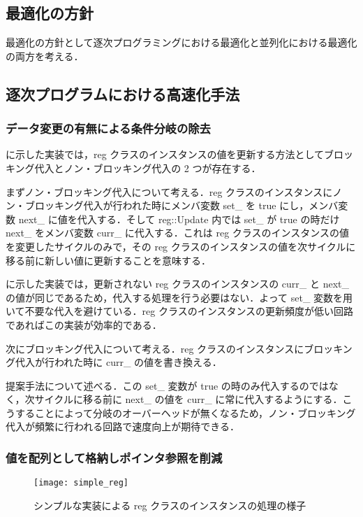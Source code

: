 \subsection{最適化の方針}

最適化の方針として逐次プログラミングにおける最適化と並列化における最適化の両方を考える．

\subsection{逐次プログラムにおける高速化手法}

\subsubsection{データ変更の有無による条件分岐の除去 \label{sss:no_set}}

 に示した実装では，reg
クラスのインスタンスの値を更新する方法としてブロッキング代入とノン・ブロッキング代入の
2 つが存在する．

まずノン・ブロッキング代入について考える．reg
クラスのインスタンスにノン・ブロッキング代入が行われた時にメンバ変数 set\_
を true にし，メンバ変数 next\_ に値を代入する．そして reg::Update
内では set\_ が true の時だけ next\_ をメンバ変数 curr\_
に代入する．これは reg
クラスのインスタンスの値を変更したサイクルのみで，その reg
クラスのインスタンスの値を次サイクルに移る前に新しい値に更新することを意味する．

 に示した実装では，更新されない reg
クラスのインスタンスの curr\_ と next\_
の値が同じであるため，代入する処理を行う必要はない．よって set\_
変数を用いて不要な代入を避けている．reg
クラスのインスタンスの更新頻度が低い回路であればこの実装が効率的である．

次にブロッキング代入について考える．reg クラスのインスタンスにブロッキング代入が行われた時に curr\_ の値を書き換える．

提案手法について述べる．この set\_ 変数が true
の時のみ代入するのではなく，次サイクルに移る前に next\_ の値を curr\_
に常に代入するようにする．こうすることによって分岐のオーバーヘッドが無くなるため，ノン・ブロッキング代入が頻繁に行われる回路で速度向上が期待できる．

\subsubsection{値を配列として格納しポインタ参照を削減} \label{sss:mem_copy}

\begin{figure}[t]
 \centering
 \texttt{[image: simple\_reg]}
 \caption{シンプルな実装による reg クラスのインスタンスの処理の様子}
 \label{fig:regs}
\end{figure}

